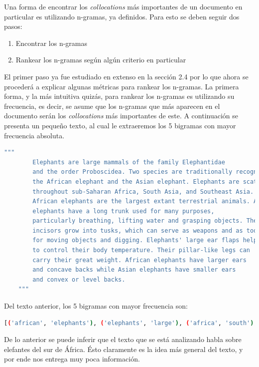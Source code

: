     Una forma de encontrar los \textit{collocations} más importantes de un documento en particular es utilizando n-gramas, ya definidos. Para esto se deben seguir dos pasos:
    \begin{enumerate}
        \item Encontrar los n-gramas 
        \item Rankear los n-gramas según algún criterio en particular
    \end{enumerate}
    El primer paso ya fue estudiado en extenso en la sección 2.4 por lo que ahora se procederá a explicar algunas métricas para rankear los n-gramas. La primera forma, y la más intuitiva quizás, para rankear los n-gramas es utilizando su frecuencia, es decir, se asume que los n-gramas que más aparecen en el documento serán los \textit{collocations} más importantes de este. A continuación se presenta un pequeño texto, al cual le extraeremos los 5 bigramas con mayor frecuencia absoluta.
    
    \begin{lstlisting}[language=Bash]
    """
        Elephants are large mammals of the family Elephantidae
        and the order Proboscidea. Two species are traditionally recognised,
        the African elephant and the Asian elephant. Elephants are scattered
        throughout sub-Saharan Africa, South Asia, and Southeast Asia. Male
        African elephants are the largest extant terrestrial animals. All
        elephants have a long trunk used for many purposes,
        particularly breathing, lifting water and grasping objects. Their
        incisors grow into tusks, which can serve as weapons and as tools
        for moving objects and digging. Elephants' large ear flaps help
        to control their body temperature. Their pillar-like legs can
        carry their great weight. African elephants have larger ears
        and concave backs while Asian elephants have smaller ears
        and convex or level backs.
    """
    \end{lstlisting}
    Del texto anterior, los 5 bigramas con mayor frecuencia son:
    \begin{lstlisting}[language=Bash]
    [('african', 'elephants'), ('elephants', 'large'), ('africa', 'south'), ('african', 'elephant'), ('animals', 'elephants')]
    \end{lstlisting}
    
    De lo anterior se  puede inferir que el texto que se está analizando habla sobre elefantes del sur de África. Ésto claramente es la idea más general del texto, y por ende nos entrega muy poca información. 
    
